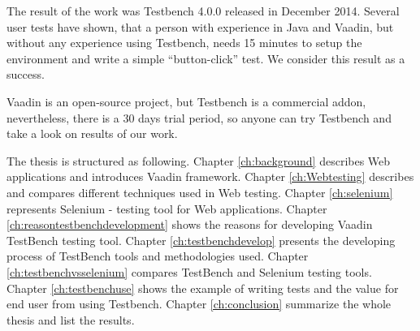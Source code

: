 	 The result of the work was Testbench 4.0.0 released in December 2014.
	 Several user tests have shown, that a person with experience in Java and
	 Vaadin, but without any experience using Testbench, needs 15 minutes to setup
	 the environment and write a simple ``button-click'' test. We consider this
	 result as a success.
	  
	 Vaadin is an open-source project, but Testbench is a commercial
	 addon, nevertheless, there is a 30 days trial period, so anyone
	 can try Testbench and take a look on results of our work.
	  
	  \iffalse
		  I will also , because Testbench is focused on testing Web
		 applications written with Vaadin. I will also describe the working flow, what
		 tools and methodologies the team used and how the final product helps
		 Vaadin developers.
	  \fi 

	  The thesis is structured as following. Chapter \ref{ch:background} describes
	  Web applications and introduces Vaadin framework. Chapter \ref{ch:Webtesting}
	  describes and compares different techniques used in Web testing. Chapter
	  \ref{ch:selenium} represents Selenium - testing tool for Web applications.
	  Chapter \ref{ch:reasontestbenchdevelopment} shows the reasons for
	  developing Vaadin TestBench testing tool. Chapter \ref{ch:testbenchdevelop} presents the developing process of TestBench tools and methodologies used.
	  Chapter \ref{ch:testbenchvsselenium} compares TestBench and Selenium testing
	  tools. Chapter \ref{ch:testbenchuse} shows the example of writing tests and
	  the value for end user from using Testbench. 
	  Chapter \ref{ch:conclusion} summarize the whole thesis and list the results.